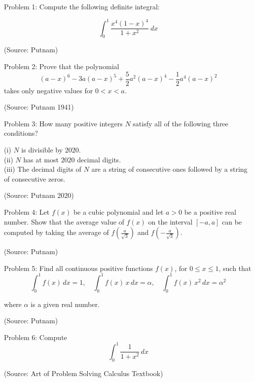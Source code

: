 Problem 1: Compute the following definite integral: 

$$\int_{0}^{1} \frac{x^4(1 - x)^4}{1 + x^2} \ dx$$

(Source: Putnam)

Problem 2: Prove that the polynomial
$$(a-x)^6 -3a(a-x)^5 +\frac{5}{2} a^2 (a-x)^4 -\frac{1}{2} a^4 (a-x)^2$$ takes only negative values for $0<x<a$.

(Source: Putnam 1941)

Problem 3: How many positive integers $N$ satisfy all of the following three conditions?

(i) $N$ is divisible by $2020$.\\
(ii) $N$ has at most $2020$ decimal digits.\\
(iii) The decimal digits of $N$ are a string of consecutive ones followed by a string of consecutive zeros.

(Source: Putnam 2020)

Problem 4: Let $f(x)$ be a cubic polynomial and let $a > 0$ be a positive real number. Show that the average value of $f(x)$ on the interval $[-a, a]$ can be computed by taking the average of $f(\frac{a}{\sqrt3})$ and $f(-\frac{a}{\sqrt3})$.

(Source: Putnam)

Problem 5: Find all continuous positive functions $f(x)$, for $0 \le x \le 1$, such that $$\int_0^1 f(x) \, dx = 1, \quad \int_0^1 f(x) \, x \, dx = \alpha, \quad \int_0^1 f(x) \, x^2 \, dx = \alpha^2$$ 

where $\alpha$ is a given real number.

(Source: Putnam)

Problem 6: Compute $$\int_0^1 \frac{1}{1 + x^2} \, dx$$

(Source: Art of Problem Solving Calculus Textbook)
